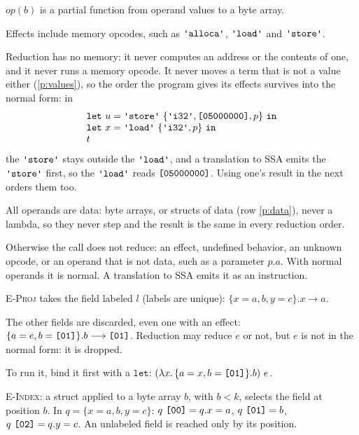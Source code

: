 \documentclass[11pt,letterpaper]{article}
\newcommand{\step}{\mathrel{\longrightarrow}}     %
\newcommand{\lam}[2]{\lambda #1.\,#2}       %
\newcommand{\fn}[1]{\mathit{#1}}                %
\newcommand{\rn}[1]{\textsc{#1}}                %
\newcommand{\kw}[1]{\mathtt{#1}}
\newcommand{\str}[1]{\text{\ttfamily\textquotesingle #1\textquotesingle}}  %
\newcommand{\hex}[1]{\text{\ttfamily [#1]}}  %
\newcommand{\pref}[1]{\ref{#1}}  %
\begin{document}
\begin{points}
  \begin{subpoints}
  \item $\fn{op}(b)$ is a partial function from operand values to a byte array.
  \item Effects include memory opcodes, such as $\str{alloca}$, $\str{load}$ and $\str{store}$.
  \item Reduction has no memory: it never computes an address or the contents of
    one, and it never runs a memory opcode. It never moves a term that is not a value either
    (\pref{p:values}), so the order the program gives its effects survives into the normal form: in
    \[\begin{array}{l}\kw{let}\ u = \str{store}\ \{\str{i32}, \hex{05000000}, p\}\ \kw{in} \\
    \kw{let}\ x = \str{load}\ \{\str{i32}, p\}\ \kw{in} \\
    t\end{array}\]
    the $\str{store}$ stays outside the $\str{load}$, and a translation to SSA emits the $\str{store}$
    first, so the $\str{load}$ reads $\hex{05000000}$. Using one's result in the next orders them too.
  \item All operands are data: byte arrays, or structs of data (row \pref{p:data}), never
    a lambda, so they never step and the result is the same in every reduction order.
  \item Otherwise the call does not reduce: an effect, undefined behavior, an unknown opcode, or an
    operand that is not data, such as a parameter $p.a$. With normal operands it is normal. A translation to SSA emits it as an instruction.
    \end{subpoints}
\item \rn{E-Proj} takes the field labeled $l$ (labels are unique): $\{x = a, b, y = c\}.x \step a$.
  \begin{subpoints}
  \item The other fields are discarded, even one with an effect:
    $\{a = e, b = \hex{01}\}.b \step \hex{01}$. Reduction may
    reduce $e$ or not, but $e$ is not in the normal form: it is dropped.
  \item To run it, bind it first with a $\kw{let}$:
    $(\lam{x}{\{a = x, b = \hex{01}\}.b})\ e$.
    \end{subpoints}
\item \rn{E-Index}: a struct applied to a byte array $b$, with $b < k$, selects the field at position $b$.
  In $q = \{x = a, b, y = c\}$: $q\ \hex{00} = q.x = a$, $q\ \hex{01} = b$,
  $q\ \hex{02} = q.y = c$. An unlabeled field is reached only by its position.

\end{points}
\end{document}
